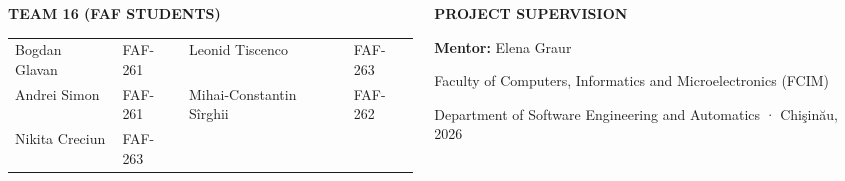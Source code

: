 \begin{frame}[t]
  \vspace{3mm}

  \begin{columns}[onlytextwidth, T]
    \begin{column}{0.485\textwidth}
      \begin{tcolorbox}[standardcard, top=5pt, bottom=5pt]
        {\scriptsize\bfseries\textcolor{textwhite}{TEAM 16 (FAF STUDENTS)}}\par\vspace{1.5mm}
        \begin{tabularx}{\textwidth}{@{}l X l X@{}}
          \tiny\textcolor{textmuted}{Bogdan Glavan} & \tiny\textcolor{textdim}{FAF-261} &
          \tiny\textcolor{textmuted}{Leonid Tiscenco} & \tiny\textcolor{textdim}{FAF-263} \\
          \tiny\textcolor{textmuted}{Andrei Simon} & \tiny\textcolor{textdim}{FAF-261} &
          \tiny\textcolor{textmuted}{Mihai-Constantin Sîrghii} & \tiny\textcolor{textdim}{FAF-262} \\
          \tiny\textcolor{textmuted}{Nikita Creciun} & \tiny\textcolor{textdim}{FAF-263} &
          & \\
        \end{tabularx}
      \end{tcolorbox}
    \end{column}

    \begin{column}{0.485\textwidth}
      \begin{tcolorbox}[standardcard, top=5pt, bottom=5pt]
        {\scriptsize\bfseries\textcolor{textwhite}{PROJECT SUPERVISION}}\par\vspace{1.5mm}
        {\tiny\textbf{\textcolor{textwhite}{Mentor:}} \textcolor{textmuted}{Elena Graur}}\par\vspace{0.8mm}
        {\tiny\textcolor{textmuted}{Faculty of Computers, Informatics and Microelectronics (FCIM)}}\par\vspace{0.5mm}
        {\tiny\textcolor{textdim}{Department of Software Engineering and Automatics · Chişinău, 2026}}
      \end{tcolorbox}
    \end{column}
  \end{columns}
\end{frame}
